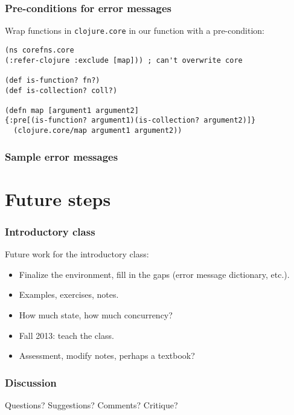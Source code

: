 \documentclass{beamer}
\begin{document}
\begin{frame}[fragile]
  \frametitle{Pre-conditions for error messages}
Wrap functions in {\tt clojure.core} in our function with a pre-condition:
\begin{verbatim}
(ns corefns.core
(:refer-clojure :exclude [map])) ; can't overwrite core 

(def is-function? fn?)
(def is-collection? coll?)

(defn map [argument1 argument2]
{:pre[(is-function? argument1)(is-collection? argument2)]}
  (clojure.core/map argument1 argument2))
\end{verbatim}
\end{frame}

\begin{frame}[fragile]
  \frametitle{Sample error messages}

\end{frame}




\section{Future steps}

\begin{frame}
  \frametitle{Introductory class}
Future work for the introductory class:
\begin{itemize}
\item Finalize the environment, fill in the gaps (error message dictionary, etc.).
\item Examples, exercises, notes. 
\item How much state, how much concurrency?
\item Fall 2013: teach the class.
\item Assessment, modify notes, perhaps a textbook?
\end{itemize}
\end{frame}



\begin{frame}
  \frametitle{Discussion}
Questions? Suggestions? Comments? Critique? 
\end{frame}
\end{document}

